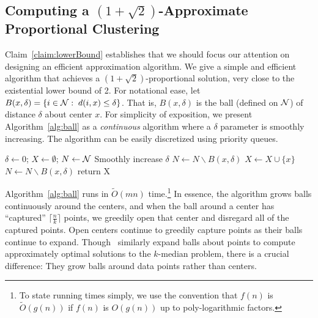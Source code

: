 \subsection{Computing a $ \left(1+\sqrt{2} \right)$-Approximate Proportional Clustering}
Claim~\ref{claim:lowerBound} establishes that we should focus our attention on designing an efficient approximation algorithm. We give a simple and efficient algorithm that achieves a $\left( 1 + \sqrt{2} \right)$-proportional solution, very close to the existential lower bound of 2. For notational ease, let $B(x, \delta) = \{i \in \mathcal {N}: \; d(i, x) \leq \delta\}$. That is, $B(x, \delta)$ is the ball (defined on $\mathcal {N}$) of distance $\delta$ about center $x$. For simplicity of exposition, we present Algorithm~\ref{alg:ball} as a \textit{continuous} algorithm where a $\delta$ parameter is smoothly increasing. The algorithm can be easily discretized using priority queues. 

\begin{algorithm}
\begin{algorithmic}[1]
\caption{Greedy Capture}
\label{alg:ball}
	\STATE $\delta \gets 0$; $X \gets \emptyset$; $N \gets \mathcal {N}$
		\STATE Smoothly increase $\delta$
			\STATE $N \gets N \backslash B(x, \delta)$
		\ENDWHILE
			\STATE $X \gets X \cup \{x\}$
			\STATE $N \gets N \backslash B(x, \delta)$
		\ENDWHILE
	\ENDWHILE
	\STATE return X
\end{algorithmic}
\end{algorithm}

Algorithm~\ref{alg:ball} runs in $\tilde{O}(mn)$ time.\footnote{To state running times simply, we use the convention that $f(n)$ is $\tilde{O}(g(n))$ if $f(n)$ is $O(g(n))$ up to poly-logarithmic factors.} In essence, the algorithm grows balls continuously around the centers, and when the ball around a center has ``captured'' $\lceil \frac{n}{k} \rceil$ points, we greedily open that center and disregard all of the captured points. Open centers continue to greedily capture points as their balls continue to expand. Though~\cite{kMedianPrimalDual,mettuPlaxton} similarly expand balls about points to compute approximately optimal solutions to the $k$-median problem, there is a crucial difference: They grow balls around data points rather than centers. %


